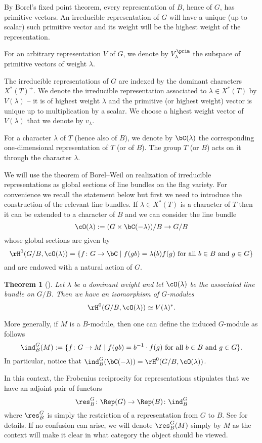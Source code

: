 \documentclass[reqno, 10pt]{amsart}
\theoremstyle{plain}
\newtheorem{theorem}[proposition]{Theorem}
\theoremstyle{definition}
\numberwithin{equation}{section}%
\begin{document}
By Borel's fixed point theorem, every representation of $B$, hence of $G$, has primitive vectors.
An irreducible representation of $G$ will have a unique (up to scalar) such primitive vector and its weight will be the highest weight of the representation.



For an arbitrary representation $V$ of $G$, we denote by $V_\lambda^\prim$ the subspace of primitive vectors of weight $\lambda$.

\medskip
The irreducible representations of $G$ are indexed by the dominant characters $X^*(T)^+$. We denote the irreducible representation associated to $\lambda\in X^*(T)$ by $V(\lambda)$ -- it is of highest weight $\lambda$ and
the primitive (or highest weight) vector is unique up to multiplication by a scalar. 
We choose a highest weight vector of $V(\lambda)$ that we denote by $v_\lambda$.

For a character $\lambda$ of $T$ (hence also of $B$), we denote by
$\bC(\lambda)$ the corresponding one-dimensional representation of $T$
(or of $B$). The group $T$ (or $B$) acts on it through the character $\lambda$.

We will use the theorem of Borel--Weil on realization of irreducible representations as global sections of line bundles on the flag variety. For convenience we recall the statement below but first we need to introduce the construction of the relevant line bundles.
If $\lambda\in X^*(T)$ is a character of $T$ then it can be extended to a character of $B$ and we can consider the line bundle
\[ \cO(\lambda):=(G\times \bC(-\lambda))/B \to G/B\]
whose global sections are given by
\[ \rH^0(G/B,\cO(\lambda)) = \{f\colon G\to \bC\mid f(gb) = \lambda(b)f(g)\text{ for all }b\in B \text{ and } g\in G\}\]
and are endowed with a natural action of $G$.
\begin{theorem}[{\cite[{Ch. 2}]{jantzen2003representations}}]
	Let $\lambda$ be a dominant weight and let $\cO(\lambda)$  be the associated line bundle on $G/B$.
	Then we have an isomorphism of $G$-modules 
	\[\rH^0(G/B,\cO(\lambda))\simeq V(\lambda)^*.\]
\end{theorem}

More generally, if $M$ is a $B$-module, then one can define the induced $G$-module as follows
\[ \ind_B^G(M):=\{f\colon G\to M\mid f(gb) = b^{-1}\cdot f(g) \text{ for all $b\in B$ and $g\in G$}\}.\]
In particular, notice that $\ind_B^G(\bC(-\lambda)) = \rH^0(G/B,\cO(\lambda))$.

In this context, the Frobenius reciprocity for representations stipulates that we have an adjoint pair of functors 
\[ \res_B^G\colon \Rep(G)\to \Rep(B)\colon \ind_B^G\]
where $\res_B^G$ is simply the restriction of a representation from $G$ to $B$.
See \cite[Proposition 3.4]{jantzen2003representations} for details.
If no confusion can arise, we will denote $\res_B^G(M)$ simply by $M$ as the context will make it clear in what category the object should be viewed.
\end{document}
